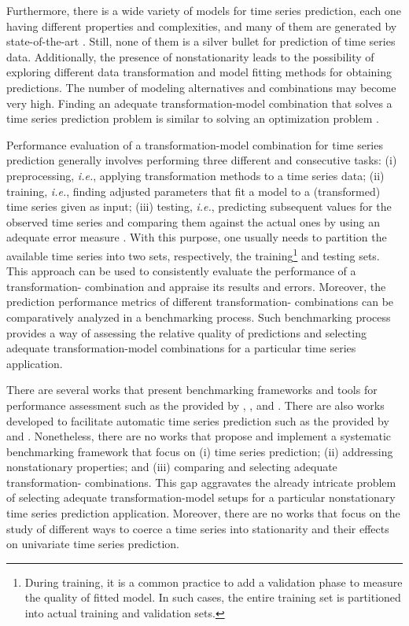 \documentclass[11pt]{dippg}
\begin{document}
Furthermore, there is a wide variety of models for time series prediction, each one having different properties and complexities, and many of them are generated by  state-of-the-art . Still, none of them is a silver bullet for prediction of time series data. Additionally, the presence of nonstationarity leads to the possibility of exploring different data transformation and model fitting methods for obtaining predictions. The number of modeling alternatives and combinations may become very high. Finding an adequate transformation-model combination that solves a time series prediction problem is similar to solving an optimization problem \cite{wolpert_no_1997}.

Performance evaluation of a transformation-model combination for time series prediction generally involves performing three different and consecutive tasks: (i) preprocessing, \emph{i.e.}, applying transformation methods to a time series data; (ii) training, \emph{i.e.}, finding adjusted parameters that fit a model to a (transformed) time series given as input; (iii) testing, \emph{i.e.}, predicting subsequent values for the observed time series and comparing them against the actual ones by using an adequate error measure \cite{ogasawara_neural_2009}. With this purpose, one usually needs to partition the available time series into two sets, respectively, the training\footnote{During training, it is a common practice to add a validation phase to measure the quality of fitted model. In such cases, the entire training set is partitioned into actual training and validation sets.} and testing sets. This approach can be used to consistently evaluate the performance of a transformation- combination and appraise its results and errors. Moreover, the prediction performance metrics of different transformation- combinations can be comparatively analyzed in a benchmarking process. Such benchmarking process provides a way of assessing the relative quality of predictions and selecting adequate transformation-model combinations for a particular time series application.

There are several works that present benchmarking frameworks and tools for  performance assessment such as the provided by \textcite{diebold_comparing_2002}, \textcite{eugster_bench_2008}, \textcite{ramey_sortinghat_2013} and \textcite{kumar_model_2016}. There are also works developed to facilitate automatic time series prediction such as the provided by \textcite{hyndman_automatic_2008} and \textcite{moreno_predtoolsts_2018}. Nonetheless, there are no works that propose and implement a systematic benchmarking framework that focus on (i) time series prediction; (ii) addressing nonstationary properties; and (iii) comparing and selecting adequate transformation- combinations. This gap aggravates the already intricate problem of selecting adequate transformation-model setups for a particular nonstationary time series prediction application. Moreover, there are no works that focus on the study of different ways to coerce a time series into stationarity and their effects on univariate time series prediction.
\end{document}
